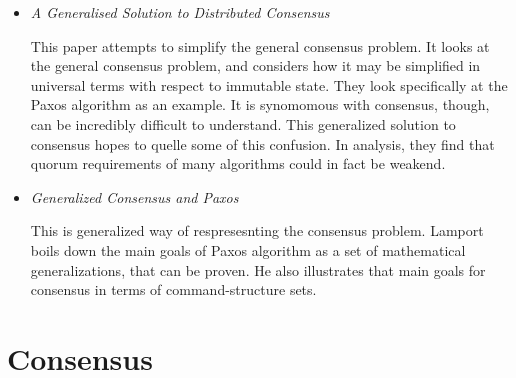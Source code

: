 \documentclass{article}
\begin{document}
\begin{itemize}

	\item
	\textit{A Generalised Solution to Distributed Consensus} \cite{HowardGeneralized}

	This paper attempts to simplify the general consensus problem. It looks at the general consensus problem, and considers how it may be simplified in universal terms with respect to immutable state. They look specifically at the Paxos algorithm as an example. 
	It is synomomous with consensus, though, can be incredibly difficult to understand. This generalized solution to consensus hopes to quelle some of this confusion.
	In analysis, they find that quorum requirements of many algorithms could in fact be weakend.

	\item
	\textit{Generalized Consensus and Paxos} \cite{lamport2005generalized}

	This is generalized way of respresesnting the consensus problem.
	Lamport boils down the main goals of Paxos algorithm as a set of mathematical generalizations, that can be proven. He also illustrates that main goals for consensus in terms of command-structure sets.


\end{itemize}

\section{Consensus}
\end{document}
